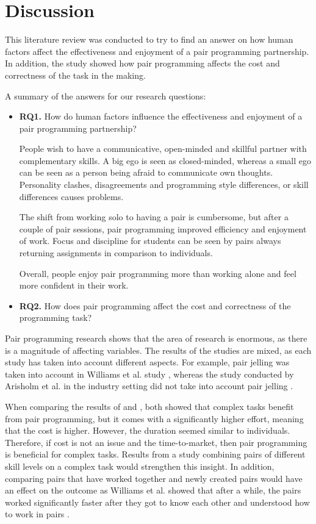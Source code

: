 \documentclass[conference]{IEEEtran}
\begin{document}
\section{Discussion}

This literature review was conducted to try to find an answer on how human factors affect the effectiveness and enjoyment of a pair programming partnership. In addition, the study showed how pair programming affects the cost and correctness of the task in the making. 

A summary of the answers for our research questions:
\begin{itemize}
    \item \textbf{RQ1.} How do human factors influence the effectiveness and enjoyment of a pair programming partnership?
    

    People wish to have a communicative, open-minded and skillful partner with complementary skills. A big ego is seen as closed-minded, whereas a small ego can be seen as a person being afraid to communicate own thoughts. Personality clashes, disagreements and programming style differences, or skill differences causes problems.

    The shift from working solo to having a pair is cumbersome, but after a couple of pair sessions, pair programming improved efficiency and enjoyment of work. Focus and discipline for students can be seen by pairs always returning assignments in comparison to individuals.

    Overall, people enjoy pair programming more than working alone and feel more confident in their work.

    
    \item \textbf{RQ2.} How does pair programming affect the cost and correctness of the programming task?
\end{itemize}


Pair programming research shows that the area of research is enormous, as there is a magnitude of affecting variables. The results of the studies are mixed, as each study has taken into account different aspects. For example, pair jelling was taken into account in Williams et al. study \cite{Williams2000Strengthening}, whereas the study conducted by Arisholm et al. in the industry setting did not take into account pair jelling \cite{Arisholm2007Evaluating}.

When comparing the results of \cite{Arisholm2007Evaluating} and \cite{10.1145/1159733.1159749}, both showed that complex tasks benefit from pair programming, but it comes with a significantly higher effort, meaning that the cost is higher. However, the duration seemed similar to individuals. Therefore, if cost is not an issue and the time-to-market, then pair programming is beneficial for complex tasks. Results from a study combining pairs of different skill levels on a complex task would strengthen this insight. In addition, comparing pairs that have worked together and newly created pairs would have an effect on the outcome as Williams et al. showed that after a while, the pairs worked significantly faster after they got to know each other and understood how to work in pairs \cite{Williams2000Strengthening}.
\end{document}
